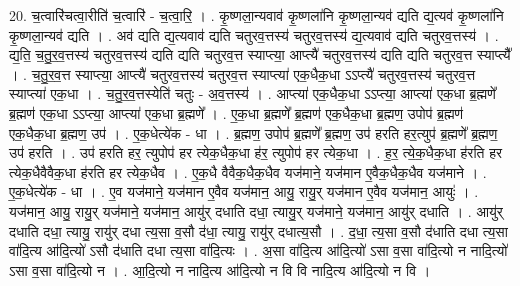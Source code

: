 \documentclass[17pt]{extarticle}
\begin{document}
20. च॒त्वारि॑चत्वा॒रीति॑ च॒त्वारि॑ - च॒त्वा॒रि॒ । . कृ॒ष्णला॒न्यवाव॑ कृ॒ष्णला॑नि कृ॒ष्णला॒न्यव॑ द्यति द्य॒त्यव॑ कृ॒ष्णला॑नि कृ॒ष्णला॒न्यव॑ द्यति । . अव॑ द्यति द्य॒त्यवाव॑ द्यति चतुरव॒त्तस्य॑ चतुरव॒त्तस्य॑ द्य॒त्यवाव॑ द्यति चतुरव॒त्तस्य॑ । . द्य॒ति॒ च॒तु॒र॒व॒त्तस्य॑ चतुरव॒त्तस्य॑ द्यति द्यति चतुरव॒त्त स्याप्त्या॒ आप्त्यै॑ चतुरव॒त्तस्य॑ द्यति द्यति चतुरव॒त्त स्याप्त्यै᳚ । . च॒तु॒र॒व॒त्त स्याप्त्या॒ आप्त्यै॑ चतुरव॒त्तस्य॑ चतुरव॒त्त स्याप्त्या॑ एक॒धैक॒धा ऽऽप्त्यै॑ चतुरव॒त्तस्य॑ चतुरव॒त्त स्याप्त्या॑ एक॒धा । . च॒तु॒र॒व॒त्तस्येति॑ चतुः - अ॒व॒त्तस्य॑ । . आप्त्या॑ एक॒धैक॒धा ऽऽप्त्या॒ आप्त्या॑ एक॒धा ब्र॒ह्मणे᳚ ब्र॒ह्मण॑ एक॒धा ऽऽप्त्या॒ आप्त्या॑ एक॒धा ब्र॒ह्मणे᳚ । . ए॒क॒धा ब्र॒ह्मणे᳚ ब्र॒ह्मण॑ एक॒धैक॒धा ब्र॒ह्मण॒ उपोप॑ ब्र॒ह्मण॑ एक॒धैक॒धा ब्र॒ह्मण॒ उप॑ । . ए॒क॒धेत्ये॑क - धा । . ब्र॒ह्मण॒ उपोप॑ ब्र॒ह्मणे᳚ ब्र॒ह्मण॒ उप॑ हरति हर॒त्युप॑ ब्र॒ह्मणे᳚ ब्र॒ह्मण॒ उप॑ हरति । . उप॑ हरति हर॒ त्युपोप॑ हर त्येक॒धैक॒धा ह॑र॒ त्युपोप॑ हर त्येक॒धा । . ह॒र॒ त्ये॒क॒धैक॒धा ह॑रति हर त्येक॒धैवैवैक॒धा ह॑रति हर त्येक॒धैव । . ए॒क॒धै वैवैक॒धैक॒धैव यज॑माने॒ यज॑मान ए॒वैक॒धैक॒धैव यज॑माने । . ए॒क॒धेत्ये॑क - धा । . ए॒व यज॑माने॒ यज॑मान ए॒वैव यज॑मान॒ आयु॒ रायु॒र् यज॑मान ए॒वैव यज॑मान॒ आयुः॑ । . यज॑मान॒ आयु॒ रायु॒र् यज॑माने॒ यज॑मान॒ आयु॑र् दधाति दधा॒ त्यायु॒र् यज॑माने॒ यज॑मान॒ आयु॑र् दधाति । . आयु॑र् दधाति दधा॒ त्यायु॒ रायु॑र् दधा त्य॒सा व॒सौ द॑धा॒ त्यायु॒ रायु॑र् दधात्य॒सौ । . द॒धा॒ त्य॒सा व॒सौ द॑धाति दधा त्य॒सा वा॑दि॒त्य आ॑दि॒त्यो॑ ऽसौ द॑धाति दधा त्य॒सा वा॑दि॒त्यः । . अ॒सा वा॑दि॒त्य आ॑दि॒त्यो॑ ऽसा व॒सा वा॑दि॒त्यो न नादि॒त्यो॑ ऽसा व॒सा वा॑दि॒त्यो न । . आ॒दि॒त्यो न नादि॒त्य आ॑दि॒त्यो न वि वि नादि॒त्य आ॑दि॒त्यो न वि । \newline
\end{document}
